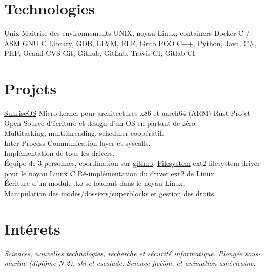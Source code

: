 \documentclass[]{twentysecondcv}
\begin{document}
\section{Technologies}

\begin{twentyshort}
  \twentyitemshortright
    {Unix}
    {Maitrise des environnements UNIX, noyau Linux, containers Docker}
  \twentyitemshortright
    {C / ASM}
    {GNU C Library, GDB, LLVM, ELF, Grub}
  \twentyitemshortright
    {POO}
    {C++, Python, Java, C\#, PHP, Ocaml}
  \twentyitemshortright
    {CVS}
    {Git, Github, GitLab, Travis CI, Gitlab-CI}
\end{twentyshort}


\section{Projets}

\begin{twenty}
  \twentyitem
    {\href{https://github.com/roblabla42/KFS/releases}{\textcolor{cerulean}{SunriseOS}}}
    {Micro-kernel pour architectures x86 et aarch64 (ARM)}
    {Rust}
    {
		Projet Open Source d'écriture et design d'un OS en partant de zéro. \\
		Multitasking, multithreading, scheduler coopératif. \\
		Inter-Process Communication layer et syscalls. \\
		Implémentation de tous les drivers. \\
		Équipe de 3 personnes, coordination sur \href{https://github.com/roblabla42/KFS/releases}{\textcolor{cerulean}{github}}.
	}
  \twentyitem
    {\href{https://github.com/orycterope/filesystem}{\textcolor{cerulean}{Filesystem}}}
    {ext2 filesystem driver pour le noyau Linux}
    {C}
    {
		Ré-implémentation du driver ext2 de Linux. \\
		Écriture d'un module .ko se loadant dans le noyau Linux. \\
		Manipulation des inodes/dossiers/superblocks et gestion des droits.
	}
\end{twenty}

\section{Intérets}

\begin{twentyshort}
  \twentyitemshortright
    {\textsc{\icon{\faFlask}}}
    {\emph{Sciences, nouvelles technologies, recherche et sécurité informatique.}}
  \twentyitemshortright
    {\textsc{\icon{\faFutbolO}}}
    {\emph{Plongée sous-marine (diplôme N.2), ski et escalade.}}
  \twentyitemshortright
    {\textsc{\icon{\faFilm}}}
    {\emph{Science-fiction, et animation américaine.}}
\end{twentyshort}

\end{document}
